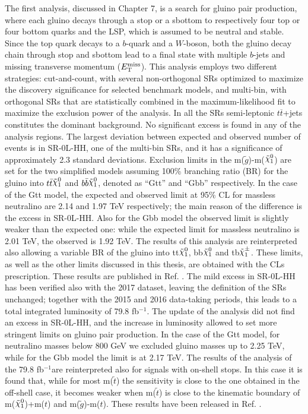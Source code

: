 \documentclass[11pt,a4paper]{article}
\def\ifb{\mbox{fb$^{-1}$}} %
\newcommand{\met}{\ensuremath{E_{\rm T}^{\mathrm{miss}}}\xspace}
\newcommand{\ttbar}{\ensuremath{t\overline{t}}\xspace}
\newcommand*{\gluino}{\ensuremath{\tilde{g}}\xspace}
\newcommand*{\ninoone}{\ensuremath{\mathchoice%
      {\displaystyle\raise.4ex\hbox{$\displaystyle\tilde\chi^0_1$}}%
         {\textstyle\raise.4ex\hbox{$\textstyle\tilde\chi^0_1$}}%
       {\scriptstyle\raise.3ex\hbox{$\scriptstyle\tilde\chi^0_1$}}%
 {\scriptscriptstyle\raise.3ex\hbox{$\scriptscriptstyle\tilde\chi^0_1$}}}\xspace}
\newcommand*{\chinoonepm}{\ensuremath{\mathchoice%
      {\displaystyle\raise.4ex\hbox{$\displaystyle\tilde\chi^\pm_1$}}%
         {\textstyle\raise.4ex\hbox{$\textstyle\tilde\chi^\pm_1$}}%
       {\scriptstyle\raise.3ex\hbox{$\scriptstyle\tilde\chi^\pm_1$}}%
 {\scriptscriptstyle\raise.3ex\hbox{$\scriptscriptstyle\tilde\chi^\pm_1$}}}\xspace}
\begin{document}
The first analysis, discussed in Chapter 7, is a search for gluino pair production, where each gluino decays through a stop or a sbottom 
to respectively four top or four bottom quarks and the LSP, which is assumed to be neutral and stable.
Since the top quark decays to a $b$-quark and a $W$-boson, both the gluino decay chain through stop and sbottom lead to a 
final state with multiple $b$-jets and missing transverse momentum (\met). 
This analysis employs two different strategies: cut-and-count, with several non-orthogonal SRs optimized to 
maximize the discovery significance for selected benchmark models, and multi-bin, with orthogonal SRs 
that are statistically combined in the maximum-likelihood fit 
to maximize the exclusion power of the analysis. 
In all the SRs semi-leptonic \ttbar+jets constitutes the dominant background.
No significant excess is found in any of the analysis regions. 
The largest deviation between expected and observed number of events 
is in SR-0L-HH, one of the multi-bin SRs, and it has a significance of approximately 
2.3 standard deviations. 
Exclusion limits in the m(\gluino)-m(\ninoone) are set for the two simplified models assuming 
100\% branching ratio (BR) for the gluino into $t\bar{t}\ninoone$ and $b\bar{b}\ninoone$, denoted as ``Gtt'' and ``Gbb'' respectively.
In the case of the Gtt model, the expected and observed limit at 95\% CL for massless neutralino 
are 2.14 and 1.97 TeV respectively; the main reason of the difference is the excess in SR-0L-HH.
Also for the Gbb model the observed limit is slightly weaker than the expected one: 
while the expected limit for massless neutralino is 2.01 TeV, the observed is 1.92 TeV.
The results of this analysis are reinterpreted also allowing a variable BR of the gluino 
into tt\ninoone, bb\ninoone and tb\chinoonepm. 
These limits, as well as the other limits discussed in this thesis, are obtained with the CLs 
prescription. These results are published in Ref. \cite{Aaboud:2017hrg}. 
The mild excess in SR-0L-HH has been verified also with the 2017 dataset,
leaving the definition of the SRs unchanged; 
together with the 2015 and 2016 data-taking periods, this leads to a total integrated luminosity 
of 79.8 \ifb. 
The update of the analysis did not find an excess in SR-0L-HH, and the increase in luminosity 
allowed to set more stringent limits on gluino pair production. 
In the case of the Gtt model, for neutralino masses below 800 GeV we excluded gluino masses up to 
2.25 TeV, while for the Gbb model the limit is at 2.17 TeV. 
The results of the analysis of the 79.8 \ifb are reinterpreted also for signals with on-shell 
stops. In this case it is found that, while for most m($\tilde{t}$) the sensitivity 
is close to the one obtained in the off-shell case, it becomes weaker 
when m($\tilde{t}$) is close to the kinematic boundary of 
m(\ninoone)+m($t$) and m(\gluino)-m($t$).  
These results have been released in Ref. \cite{ATLAS-CONF-2018-041}.
\end{document}
